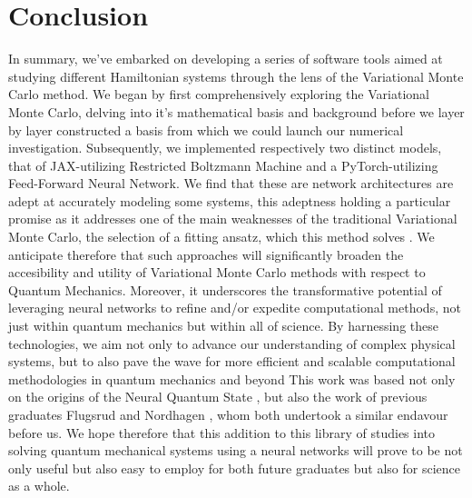 \documentclass[12pt]{article}
\begin{document}
{\part{Conclusion}
In summary, we've embarked on developing a series of software tools aimed at studying different Hamiltonian systems through the lens of the Variational Monte Carlo method. We began by first comprehensively exploring the Variational Monte Carlo, delving into it's mathematical basis and background before we layer by layer constructed a basis from which we could launch our numerical investigation.
\newline
Subsequently, we implemented respectively two distinct models, that of JAX-utilizing Restricted Boltzmann Machine and a PyTorch-utilizing Feed-Forward Neural Network. We find that these are network architectures are adept at accurately modeling some systems, this adeptness holding a particular promise as it addresses one of the main weaknesses of the traditional Variational Monte Carlo, the selection of a fitting ansatz, which this method solves .
\newline
We anticipate therefore that such approaches will significantly broaden the accesibility and utility of Variational Monte Carlo methods with respect to Quantum Mechanics. Moreover, it underscores the transformative potential of leveraging neural networks to refine and/or expedite computational methods, not just within quantum mechanics but within all of science. By harnessing these technologies, we aim not only to advance our understanding of complex physical systems, but to also pave the wave for more efficient and scalable computational methodologies in quantum mechanics and beyond \newline
This work was based not only on the origins of the Neural Quantum State \cite{NQS}, but also the work of previous graduates Flugsrud \cite{flugsrud} and Nordhagen \cite{nordhagen}, whom both undertook a similar endavour before us. We hope therefore that this addition to this library of studies into solving quantum mechanical systems using a neural networks will prove to be not only useful but also easy to employ for both future graduates but also for science as a whole.
\newpage
}
\end{document}
